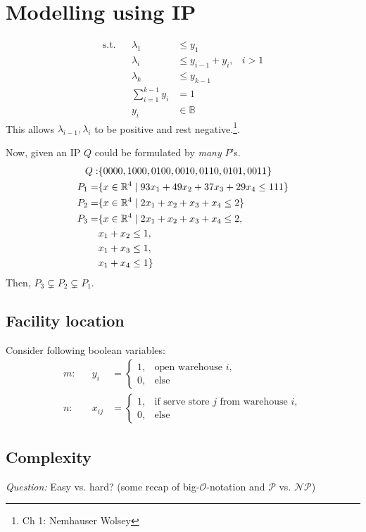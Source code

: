 

\section{Modelling using IP}


\begin{align*}
    \text{s.t.} &  & \lambda_1            & \leq y_1                  \\
                &  & \lambda_i            & \leq y_{i-1} + y_i, & i>1 \\
                &  & \lambda_k            & \leq y_{k-1}              \\
                &  & \sum_{i=1}^{k-1} y_i & = 1                       \\
                &  & y_i                  & \in \mathbb{B}
\end{align*}
This allows $\lambda_{i-1}, \lambda_{i}$ to be positive and rest negative.\footnote{Ch 1: Nemhauser Wolsey}.

Now, given an IP $Q$ could be formulated by \emph{many} $P$'s.
\begin{align*}
    Q:    & \{0000,1000,0100,0010,0110,0101,0011\}                          \\
    P_1 = & \{x \in \mathbb{R}^4 \mid 93 x_1 + 49x_2 + 37x_3+29x_4 \leq 111\} \\
    P_2 = & \{x \in \mathbb{R}^4 \mid 2 x_1 + x_2 + x_3+ x_4 \leq 2\}         \\
    P_3 = & \{x \in \mathbb{R}^4 \mid 2 x_1 + x_2 + x_3+ x_4 \leq 2,          \\
          & x_1 + x_2 \leq 1,                                               \\
          & x_1 + x_3 \leq 1,                                               \\
          & x_1 + x_4 \leq 1\}                                              \\
\end{align*}
Then, $P_3 \subsetneq P_2 \subsetneq P_1$.

\subsection*{Facility location}
Consider following boolean variables:
\begin{align*}
    m: &  & y_i    & = \begin{cases}
        1, & \text{open warehouse } i, \\
        0, & \text{else}
    \end{cases} \\
    n: &  & x_{ij} & = \begin{cases}
        1, & \text{if serve store } j \text{ from warehouse } i, \\
        0, & \text{else}
    \end{cases}
\end{align*}

\subsection*{Complexity}
\emph{Question:} Easy vs. hard?\newline
(some recap of big-$\mathcal{O}$-notation and $\mathcal{P}$ vs. $\mathcal{NP}$)\newline
